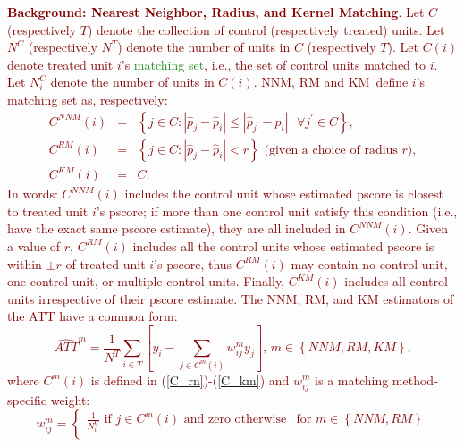 \documentclass{article}
\begin{document}
\noindent \textcolor{Maroon}{\textbf{Background: Nearest Neighbor, Radius, and Kernel Matching}.
Let $C$ (respectively $T$) denote the collection of control (respectively treated) units. Let $N^{C}$ (respectively $N^{T}$) denote the number of units in $C$ (respectively $T$). Let $C\left( i\right) $ denote treated unit $i$'s \textcolor{ForestGreen}{matching set}, i.e., the set of control units matched to $i$. Let $N_{i}^{C}$ denote the number of units in $C\left( i\right) $. NNM, RM and KM\ define $i$'s matching set as, respectively: 
\begin{eqnarray}
C^{NNM}\left( i\right) &=&\left\{ j\in C:\left\vert \widehat{p}_{j}-\widehat{p}_{i}\right\vert \leq \left\vert \widehat{p}_{j^{\prime }}-\widehat{p}_{i}\right\vert \text{ }\forall j^{\prime }\in C\right\} \text{,}
\label{C_rn} \\
C^{RM}\left( i\right) &=&\left\{ j\in C:\left\vert \widehat{p}_{j}-\widehat{p}_{i}\right\vert <r\right\} \text{ (given a choice of radius }r\text{),} \label{C_rm} \\
C^{KM}\left( i\right) &=&C\text{.}  \label{C_km}
\end{eqnarray}
\noindent In words: $C^{NNM}\left( i\right)$ includes the control unit whose estimated pscore is closest to treated unit $i$'s pscore; if more than one control unit satisfy this condition (i.e., have the exact same pscore estimate), they are all included in $C^{NNM}\left( i\right)$. Given a value of $r$, $C^{RM}\left( i\right)$ includes all the control units whose estimated pscore is within $\pm r$ of treated unit $i$'s pscore, thus $C^{RM}\left( i\right)$ may contain no control unit, one control unit, or multiple control units. Finally, $C^{KM}\left( i\right)$ includes all control units irrespective of their pscore estimate.
\noindent The NNM, RM, and KM estimators of the ATT have a common form: 
\begin{equation}
\widehat{ATT}^{m} = \frac{1}{N^{T}} \sum_{i \in T}\left[y_{i}-\sum_{j \in C^{m}\left( i\right) }w_{ij}^{m}y_{j}\right] \text{, }m \in \left\{ NNM,RM,KM\right\} \text{,}  \label{ATT_m}
\end{equation}
\noindent where $C^{m}\left( i\right) $ is defined in (\ref{C_rn})-(\ref{C_km}) and $w_{ij}^{m}$ is a matching method-specific weight:
\begin{equation}
w_{ij}^{m}=\left\{ 
\begin{array}{ll}
\frac{1}{N_{i}^{C}}\text{ if }j\in C^{m}\left( i\right) \text{ and zero
otherwise} & \text{for }m\in \left\{ NNM,RM\right\} \\ 

\end{array}
\end{equation}}
\end{document}
